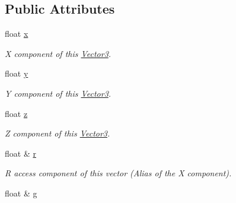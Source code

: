 \subsection*{Public Attributes}
\begin{DoxyCompactItemize}
\item 
\hypertarget{classchaos_1_1gfx_1_1_vector3_ac58f0d4a6e611ae3eec8e9f56476fc13}{float \hyperlink{classchaos_1_1gfx_1_1_vector3_ac58f0d4a6e611ae3eec8e9f56476fc13}{x}}\label{classchaos_1_1gfx_1_1_vector3_ac58f0d4a6e611ae3eec8e9f56476fc13}

\begin{DoxyCompactList}\small\item\em X component of this \hyperlink{classchaos_1_1gfx_1_1_vector3}{Vector3}. \end{DoxyCompactList}\item 
\hypertarget{classchaos_1_1gfx_1_1_vector3_ac001a2e7468d6c6cfc5119d486817f0b}{float \hyperlink{classchaos_1_1gfx_1_1_vector3_ac001a2e7468d6c6cfc5119d486817f0b}{y}}\label{classchaos_1_1gfx_1_1_vector3_ac001a2e7468d6c6cfc5119d486817f0b}

\begin{DoxyCompactList}\small\item\em Y component of this \hyperlink{classchaos_1_1gfx_1_1_vector3}{Vector3}. \end{DoxyCompactList}\item 
\hypertarget{classchaos_1_1gfx_1_1_vector3_a7ec457e7ef3054557dacdc89bf7ce77b}{float \hyperlink{classchaos_1_1gfx_1_1_vector3_a7ec457e7ef3054557dacdc89bf7ce77b}{z}}\label{classchaos_1_1gfx_1_1_vector3_a7ec457e7ef3054557dacdc89bf7ce77b}

\begin{DoxyCompactList}\small\item\em Z component of this \hyperlink{classchaos_1_1gfx_1_1_vector3}{Vector3}. \end{DoxyCompactList}\item 
\hypertarget{classchaos_1_1gfx_1_1_vector3_a1871c73a8c5f77294a62c9de0c6b17f6}{float \& \hyperlink{classchaos_1_1gfx_1_1_vector3_a1871c73a8c5f77294a62c9de0c6b17f6}{r}}\label{classchaos_1_1gfx_1_1_vector3_a1871c73a8c5f77294a62c9de0c6b17f6}

\begin{DoxyCompactList}\small\item\em R access component of this vector (Alias of the X component). \end{DoxyCompactList}\item 
\hypertarget{classchaos_1_1gfx_1_1_vector3_a3ecbc6e07f1b55f11e6174e173ce67df}{float \& \hyperlink{classchaos_1_1gfx_1_1_vector3_a3ecbc6e07f1b55f11e6174e173ce67df}{g}}\label{classchaos_1_1gfx_1_1_vector3_a3ecbc6e07f1b55f11e6174e173ce67df}


\end{DoxyCompactItemize}
